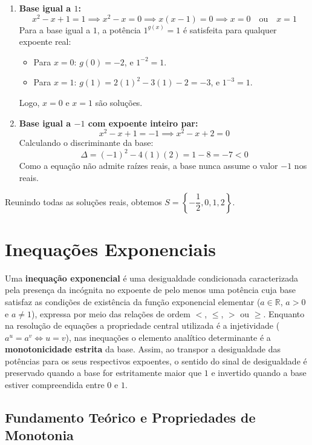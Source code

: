 \documentclass[12pt,a4paper]{report}
\begin{document}
\begin{enumerate}[label=\textbf{\arabic*.}]
\begin{enumerate}[label=\alph*)]
		\item \textbf{Base igual a $1$:}
		\[
		x^2 - x + 1 = 1 \implies x^2 - x = 0 \implies x(x - 1) = 0 \implies x = 0 \quad \text{ou} \quad x = 1
		\]
		Para a base igual a $1$, a potência $1^{g(x)} = 1$ é satisfeita para qualquer expoente real:
		\begin{itemize}
			\item Para $x = 0$: $g(0) = -2$, e $1^{-2} = 1$.
			\item Para $x = 1$: $g(1) = 2(1)^2 - 3(1) - 2 = -3$, e $1^{-3} = 1$.
		\end{itemize}
		Logo, $x = 0$ e $x = 1$ são soluções.
		
		\item \textbf{Base igual a $-1$ com expoente inteiro par:}
		\[
		x^2 - x + 1 = -1 \implies x^2 - x + 2 = 0
		\]
		Calculando o discriminante da base:
		\[
		\Delta = (-1)^2 - 4(1)(2) = 1 - 8 = -7 < 0
		\]
		Como a equação não admite raízes reais, a base nunca assume o valor $-1$ nos reais.
	\end{enumerate}
	Reunindo todas as soluções reais, obtemos $S = \left\{ -\dfrac{1}{2}, 0, 1, 2 \right\}$.
	
\end{enumerate}

	\chapter{Inequações Exponenciais}
	\label{sec:inequacoes_exp}
	
	Uma \textbf{inequação exponencial} é uma desigualdade condicionada caracterizada pela presença da incógnita no expoente de pelo menos uma potência cuja base satisfaz as condições de existência da função exponencial elementar ($a \in \mathbb{R}$, $a > 0$ e $a \neq 1$), expressa por meio das relações de ordem $<$, $\leqslant$, $>$ ou $\geqslant$. Enquanto na resolução de equações a propriedade central utilizada é a injetividade ($a^u = a^v \iff u = v$), nas inequações o elemento analítico determinante é a \textbf{monotonicidade estrita} da base. Assim, ao transpor a desigualdade das potências para os seus respectivos expoentes, o sentido do sinal de desigualdade é preservado quando a base for estritamente maior que $1$ e invertido quando a base estiver compreendida entre $0$ e $1$.
	
	\section{Fundamento Teórico e Propriedades de Monotonia}
	\label{subsec:propriedade_inequacoes}
	
\end{document}
